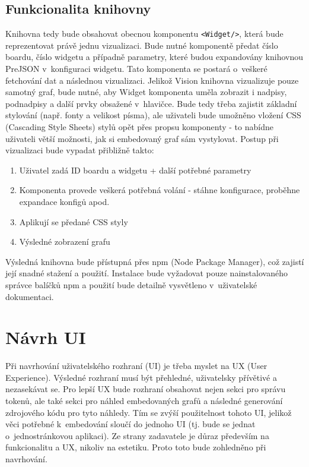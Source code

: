 \documentclass[czech, bc, kiv, he, iso690numb, viewonly]{fasthesis} %
\begin{document}
\subsection{Funkcionalita knihovny}
Knihovna tedy bude obsahovat obecnou komponentu \texttt{<Widget/>}, která bude reprezentovat právě jednu vizualizaci. Bude nutné komponentě předat číslo boardu, číslo widgetu a případně parametry, které 
budou expandovány knihovnou PreJSON v~konfiguraci widgetu. Tato komponenta se postará o~veškeré fetchování dat a následnou vizualizaci. Jelikož Vision knihovna vizualizuje pouze samotný graf, bude nutné, aby
Widget komponenta uměla zobrazit i nadpisy, podnadpisy a další prvky obsažené v~hlavičce. Bude tedy třeba zajistit základní stylování (např. fonty a velikost písma), ale uživateli bude umožněno vložení CSS (Cascading Style Sheets) stylů
opět přes propsu komponenty - to nabídne uživateli větší možnosti, jak si embedovaný graf sám vystylovat. Postup při vizualizaci bude vypadat přibližně takto:

\begin{enumerate}
	\item Uživatel zadá ID boardu a widgetu + další potřebné parametry
	\item Komponenta provede veškerá potřebná volání - stáhne konfigurace, proběhne expandace konfigů apod.
	\item Aplikují se předané CSS styly 
	\item Výsledné zobrazení grafu
\end{enumerate}

Výsledná knihovna bude přístupná přes npm (Node Package Manager), což zajistí její snadné stažení a použití. Instalace bude vyžadovat pouze nainstalovaného správce balíčků npm a použití bude
detailně vysvětleno v~uživatelské dokumentaci.

\section{Návrh UI}

Při navrhování uživatelského rozhraní (UI) je třeba myslet na UX (User Experience). Výsledné rozhraní musí být přehledné, uživatelsky přívětivé a nezasekávat se. Pro lepší UX bude rozhraní 
obsahovat nejen sekci pro správu tokenů, ale také sekci pro náhled embedovaných grafů a následné generování zdrojového kódu pro tyto náhledy. Tím se zvýší použitelnost tohoto UI, jelikož 
věci potřebné k~embedování sloučí do jednoho UI (tj. bude se jednat o~jednostránkovou aplikaci). Ze strany zadavatele je důraz především na funkcionalitu a UX, nikoliv na estetiku. Proto toto bude zohledněno při navrhování.
\end{document}
